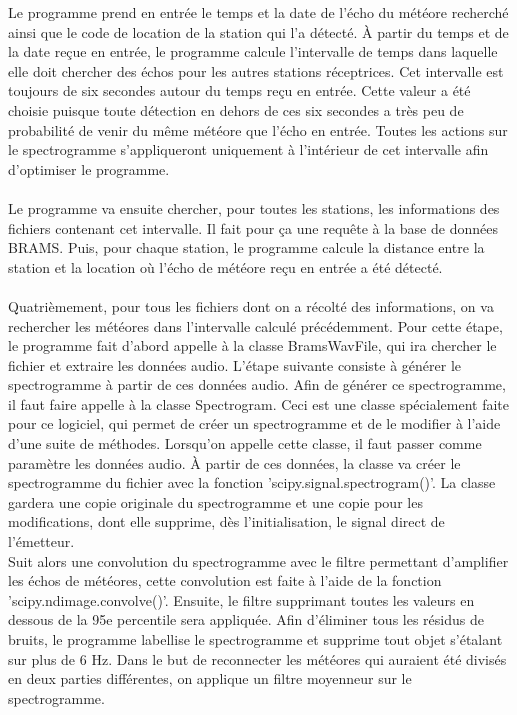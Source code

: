 \documentclass[11pt]{article}
\begin{document}
Le programme prend en entrée le temps et la date de l'écho du météore recherché ainsi que le code de location de la station qui l'a détecté.
À partir du temps et de la date reçue en entrée, le programme calcule l'intervalle de temps dans laquelle elle doit chercher des échos pour les autres stations réceptrices.
Cet intervalle est toujours de six secondes autour du temps reçu en entrée.
Cette valeur a été choisie puisque toute détection en dehors de ces six secondes a très peu de probabilité de venir du même météore que l'écho en entrée.
Toutes les actions sur le spectrogramme s'appliqueront uniquement à l'intérieur de cet intervalle afin d'optimiser le programme.\\
\\
Le programme va ensuite chercher, pour toutes les stations, les informations des fichiers contenant cet intervalle.
Il fait pour ça une requête à la base de données BRAMS.
Puis, pour chaque station, le programme calcule la distance entre la station et la location où l'écho de météore reçu en entrée a été détecté.\\
\\
Quatrièmement, pour tous les fichiers dont on a récolté des informations, on va rechercher les météores dans l'intervalle calculé précédemment.
Pour cette étape, le programme fait d'abord appelle à la classe BramsWavFile, qui ira chercher le fichier et extraire les données audio.
L'étape suivante consiste à générer le spectrogramme à partir de ces données audio.
Afin de générer ce spectrogramme, il faut faire appelle à la classe Spectrogram.
Ceci est une classe spécialement faite pour ce logiciel, qui permet de créer un spectrogramme et de le modifier à l'aide d'une suite de méthodes.
Lorsqu'on appelle cette classe, il faut passer comme paramètre les données audio.
À partir de ces données, la classe va créer le spectrogramme du fichier avec la fonction 'scipy.signal.spectrogram()'.
La classe gardera une copie originale du spectrogramme et une copie pour les modifications, dont elle supprime, dès l'initialisation, le signal direct de l'émetteur.\\
Suit alors une convolution du spectrogramme avec le filtre permettant d'amplifier les échos de météores, cette convolution est faite à l'aide de la fonction 'scipy.ndimage.convolve()'.
Ensuite, le filtre supprimant toutes les valeurs en dessous de la 95e percentile sera appliquée.
Afin d'éliminer tous les résidus de bruits, le programme labellise le spectrogramme et supprime tout objet s'étalant sur plus de 6 Hz.
Dans le but de reconnecter les météores qui auraient été divisés en deux parties différentes, on applique un filtre moyenneur sur le spectrogramme.
\end{document}
